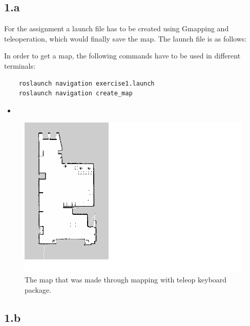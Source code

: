 
\subsection*{1.a}
For the assignment a launch file has to be created using Gmapping and teleoperation, which would finally save the map. The launch file is as follows:



In order to get a map, the following commands have to be used in different terminals:

\begin{lstlisting}
	roslaunch navigation exercise1.launch
	roslaunch navigation create_map
\end{lstlisting}

\begin{itemize}
	\item {}
\end{itemize}

\begin{figure}
	\centering
	\includegraphics[width=\textwidth]{./img/map_teleop.png}
	\caption{The map that was made through mapping with teleop keyboard package.}
	\label{fig:1:map}
\end{figure}

\subsection*{1.b}

